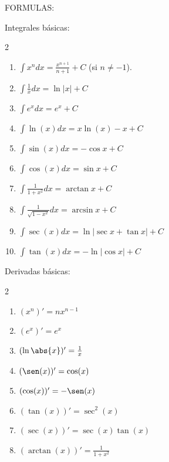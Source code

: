 \documentclass{article}
\begin{document}
\newpage
\noindent\textsf{\large FORMULAS:}
\vspace{3mm}

{\large Integrales básicas:}
\begin{multicols}{2}
  \begin{enumerate}
    \item $\displaystyle\int x^n dx = \frac{x^{n+1}}{n+1}+C$ (si $n\neq -1$).
    \item $\displaystyle\int \frac{1}{x}dx = \ln|x|+C$
    \item $\displaystyle\int e^x dx = e^x+C$
    \item $\displaystyle\int \ln(x) dx = x\ln(x)-x+C$
    \item $\displaystyle\int \sin(x) dx = -\cos x+C$
    \item $\displaystyle\int \cos(x) dx = \sin x+C$
    \item $\displaystyle\int \frac{1}{1+x^2}dx = \arctan x+C$
    \item $\displaystyle\int \frac{1}{\sqrt{1-x^2}}dx = \arcsin x+C$
    \item $\displaystyle\int \sec(x) dx = \ln|\sec x+\tan x|+C$
    \item $\displaystyle\int \tan(x) dx = -\ln|\cos x|+C$
  \end{enumerate}
\end{multicols}
\vspace{2mm}

{\large Derivadas básicas:}
\begin{multicols}{2}
  \begin{enumerate}
    \item $(x^n)' = nx^{n-1}$
    \item $(e^x)' = e^x$
    \item $(\ln\abs{x})' = \frac{1}{x}$
    \item $(\sen(x))' = \cos(x)$
    \item $(\cos(x))' = -\sen(x)$
    \item $(\tan(x))' = \sec^2(x)$
    \item $(\sec(x))' = \sec(x)\tan(x)$
    \item $(\arctan(x))' = \frac{1}{1+x^2}$
  \end{enumerate}
\end{multicols}
\vspace{2mm}
\end{document}
